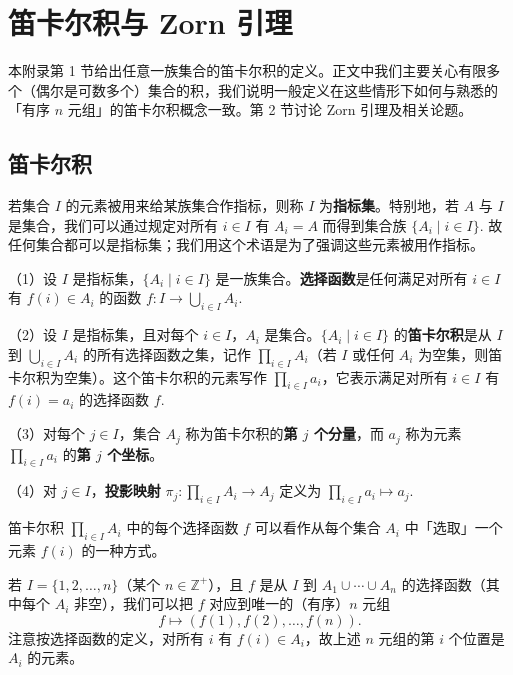 
\appendix

\chapter{笛卡尔积与 Zorn 引理}

本附录第 1 节给出任意一族集合的笛卡尔积的定义。正文中我们主要关心有限多个（偶尔是可数多个）集合的积，我们说明一般定义在这些情形下如何与熟悉的「有序 \(n\) 元组」的笛卡尔积概念一致。第 2 节讨论 Zorn 引理及相关论题。

\section{笛卡尔积}

若集合 \(I\) 的元素被用来给某族集合作指标，则称 \(I\) 为\textbf{指标集}。特别地，若 \(A\) 与 \(I\) 是集合，我们可以通过规定对所有 \(i \in I\) 有 \(A_i = A\) 而得到集合族 \(\{A_i \mid i \in I\}\). 故任何集合都可以是指标集；我们用这个术语是为了强调这些元素被用作指标。

\begin{definition}
（1）设 \(I\) 是指标集，\(\{A_i \mid i \in I\}\) 是一族集合。\textbf{选择函数}是任何满足对所有 \(i \in I\) 有 \(f(i) \in A_i\) 的函数 \(f : I \to \bigcup_{i \in I}A_i\).

（2）设 \(I\) 是指标集，且对每个 \(i \in I\)，\(A_i\) 是集合。\(\{A_i \mid i \in I\}\) 的\textbf{笛卡尔积}是从 \(I\) 到 \(\bigcup_{i \in I}A_i\) 的所有选择函数之集，记作 \(\prod_{i \in I}A_i\)（若 \(I\) 或任何 \(A_i\) 为空集，则笛卡尔积为空集）。这个笛卡尔积的元素写作 \(\prod_{i \in I}a_i\)，它表示满足对所有 \(i \in I\) 有 \(f(i) = a_i\) 的选择函数 \(f\).

（3）对每个 \(j \in I\)，集合 \(A_j\) 称为笛卡尔积的\textbf{第 \(j\) 个分量}，而 \(a_j\) 称为元素 \(\prod_{i \in I}a_i\) 的\textbf{第 \(j\) 个坐标}。

（4）对 \(j \in I\)，\textbf{投影映射} \(\pi_j : \prod_{i \in I}A_i \to A_j\) 定义为 \(\prod_{i \in I}a_i \mapsto a_j\).
\end{definition}

笛卡尔积 \(\prod_{i \in I}A_i\) 中的每个选择函数 \(f\) 可以看作从每个集合 \(A_i\) 中「选取」一个元素 \(f(i)\) 的一种方式。

若 \(I = \{1, 2, \ldots, n\}\)（某个 \(n \in \mathbb{Z}^+\)），且 \(f\) 是从 \(I\) 到 \(A_1 \cup \cdots \cup A_n\) 的选择函数（其中每个 \(A_i\) 非空），我们可以把 \(f\) 对应到唯一的（有序）\(n\) 元组
\[
f \mapsto (f(1), f(2), \ldots, f(n)).
\]
注意按选择函数的定义，对所有 \(i\) 有 \(f(i) \in A_i\)，故上述 \(n\) 元组的第 \(i\) 个位置是 \(A_i\) 的元素。


